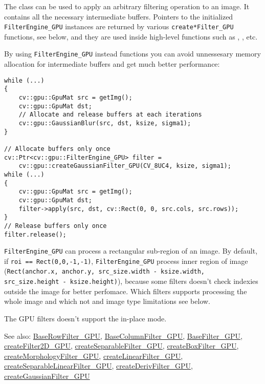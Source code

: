 The class can be used to apply an arbitrary filtering operation to an image. It contains all the necessary intermediate buffers. Pointers to the initialized \texttt{FilterEngine\_GPU} instances are returned by various \texttt{create*Filter\_GPU} functions, see below, and they are used inside high-level functions such as , ,  etc.

By using \texttt{FilterEngine\_GPU} instead functions you can avoid unnessesary memory allocation for intermediate buffers and get much better performance:

\begin{lstlisting}
while (...)
{
    cv::gpu::GpuMat src = getImg();
    cv::gpu::GpuMat dst;
    // Allocate and release buffers at each iterations
    cv::gpu::GaussianBlur(src, dst, ksize, sigma1);
}

// Allocate buffers only once
cv::Ptr<cv::gpu::FilterEngine_GPU> filter = 
    cv::gpu::createGaussianFilter_GPU(CV_8UC4, ksize, sigma1);
while (...)
{
    cv::gpu::GpuMat src = getImg();
    cv::gpu::GpuMat dst;
    filter->apply(src, dst, cv::Rect(0, 0, src.cols, src.rows));
}
// Release buffers only once
filter.release();
\end{lstlisting}

\texttt{FilterEngine\_GPU} can process a rectangular sub-region of an image. By default, if \texttt{roi == Rect(0,0,-1,-1)}, \texttt{FilterEngine\_GPU} process inner region of image (\texttt{Rect(anchor.x, anchor.y, src\_size.width - ksize.width, src\_size.height - ksize.height)}), because some filters doesn't check indexies outside the image for better perfomace. Which filters supports processing the whole image and which not and image type limitations see below.

The GPU filters doesn't support the in-place mode.

See also: \hyperref[class.gpu.BaseRowFilter]{BaseRowFilter\_GPU}, \hyperref[class.gpu.BaseColumnFilter]{BaseColumnFilter\_GPU}, \hyperref[class.gpu.BaseFilter]{BaseFilter\_GPU}, \hyperref[cppfunc.gpu.createFilter2D]{createFilter2D\_GPU}, \hyperref[cppfunc.gpu.createSeparableFilter]{createSeparableFilter\_GPU}, \hyperref[cppfunc.gpu.createBoxFilter]{createBoxFilter\_GPU}, \hyperref[cppfunc.gpu.createMorphologyFilter]{createMorphologyFilter\_GPU}, \hyperref[cppfunc.gpu.createLinearFilter]{createLinearFilter\_GPU}, \hyperref[cppfunc.gpu.createSeparableLinearFilter]{createSeparableLinearFilter\_GPU}, \hyperref[cppfunc.gpu.createDerivFilter]{createDerivFilter\_GPU}, \hyperref[cppfunc.gpu.createGaussianFilter]{createGaussianFilter\_GPU}

